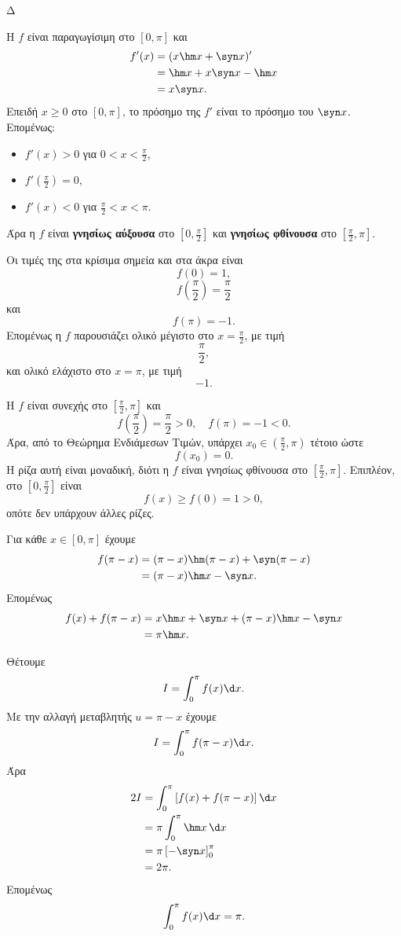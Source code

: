 \begin{thema}{Δ}
\begin{erwthma}
\item Η $f$ είναι παραγωγίσιμη στο $[0,\pi]$ και
\begin{align*}
f'(x)
&=(x\hm x+\syn x)'\\
&=\hm x+x\syn x-\hm x\\
&=x\syn x.
\end{align*}
Επειδή $x\geq0$ στο $[0,\pi]$, το πρόσημο της $f'$ είναι το πρόσημο του $\syn x$. Επομένως:
\begin{itemize}
\item $f'(x)>0$ για $0<x<\frac{\pi}{2}$,
\item $f'\left(\frac{\pi}{2}\right)=0$,
\item $f'(x)<0$ για $\frac{\pi}{2}<x<\pi$.
\end{itemize}
Άρα η $f$ είναι \textbf{γνησίως αύξουσα} στο $\left[0,\frac{\pi}{2}\right]$ και \textbf{γνησίως φθίνουσα} στο $\left[\frac{\pi}{2},\pi\right]$.

Οι τιμές της στα κρίσιμα σημεία και στα άκρα είναι
\[
f(0)=1,
\]
\[
f\left(\frac{\pi}{2}\right)=\frac{\pi}{2}
\]
και
\[
f(\pi)=-1.
\]
Επομένως η $f$ παρουσιάζει ολικό μέγιστο στο $x=\frac{\pi}{2}$, με τιμή
\[
{\frac{\pi}{2}},
\]
και ολικό ελάχιστο στο $x=\pi$, με τιμή
\[
{-1}.
\]

\item Η $f$ είναι συνεχής στο $\left[\frac{\pi}{2},\pi\right]$ και
\[
f\left(\frac{\pi}{2}\right)=\frac{\pi}{2}>0,
\quad
f(\pi)=-1<0.
\]
Άρα, από το Θεώρημα Ενδιάμεσων Τιμών, υπάρχει $x_0\in\left(\frac{\pi}{2},\pi\right)$ τέτοιο ώστε
\[
f(x_0)=0.
\]
Η ρίζα αυτή είναι μοναδική, διότι η $f$ είναι γνησίως φθίνουσα στο $\left[\frac{\pi}{2},\pi\right]$. Επιπλέον, στο $\left[0,\frac{\pi}{2}\right]$ είναι
\[
f(x)\geq f(0)=1>0,
\]
οπότε δεν υπάρχουν άλλες ρίζες.

\item Για κάθε $x\in[0,\pi]$ έχουμε
\begin{align*}
f(\pi-x)
&=(\pi-x)\hm(\pi-x)+\syn(\pi-x)\\
&=(\pi-x)\hm x-\syn x.
\end{align*}
Επομένως
\begin{align*}
f(x)+f(\pi-x)
&=x\hm x+\syn x+(\pi-x)\hm x-\syn x\\
&={\pi\hm x}.
\end{align*}

Θέτουμε
\[
I=\int_0^\pi f(x)\d x.
\]
Με την αλλαγή μεταβλητής $u=\pi-x$ έχουμε
\[
I=\int_0^\pi f(\pi-x)\d x.
\]
Άρα
\begin{align*}
2I
&=\int_0^\pi\left[f(x)+f(\pi-x)\right]\d x\\
&=\pi\int_0^\pi\hm x\,\d x\\
&=\pi\left[-\syn x\right]_0^\pi\\
&=2\pi.
\end{align*}
Επομένως
\[
{\int_0^\pi f(x)\d x=\pi}.
\]


\end{erwthma}
\end{thema}
